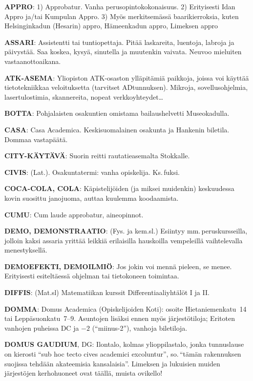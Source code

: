 \documentclass[../ala_hataile.tex]{subfiles}
\begin{document}
\textbf{APPRO}: 1) Approbatur. Vanha perusopintokokonaisuus.
2) Erityisesti Idan Appro
ja/tai Kumpulan Appro. 3) Myös merkitsemässä
baarikierroksia, kuten Helsinginkadun
(Hesarin) appro, Hämeenkadun appro,
Limeksen appro

\textbf{ASSARI}: Assistentti tai tuntiopettaja. Pitää
laskareita, luentoja, labroja ja päivystää.
Saa koskea, kysyä, sinutella ja muutenkin
vaivata. Neuvoo mieluiten vastaanottoaikana.

\textbf{ATK-ASEMA}: Yliopiston ATK-osaston ylläpitämiä paikkoja, joissa voi käyttää
tietotekniikkaa veloituksetta (tarvitset ADtunnuksen).
Mikroja, sovellusohjelmia,
lasertulostimia, skannereita, nopeat verkkoyhteydet\dots

\textbf{BOTTA}: Pohjalaisten osakuntien omistama
bailaushelvetti Museokadulla.

\textbf{CASA}: Casa Academica. Keskisuomalainen
osakunta ja Hankenin biletila. Dommaa
vastapäätä.

\textbf{CITY-KÄYTÄVÄ}: Suorin reitti rautatieasemalta
Stokkalle.

\textbf{CIVIS}: (Lat.). Osakuntatermi: vanha opiskelija.
Ks.\,fuksi.

\textbf{COCA-COLA, COLA}: Käpistelijöiden
(ja miksei muidenkin) keskuudessa kovin
suosittu janojuoma, auttaa kuulemma koodaamista.

\textbf{CUMU}: Cum laude approbatur, aineopinnot.

\textbf{DEMO, DEMONSTRAATIO}: (Fys. ja
kem.sl.) Esiintyy mm.\,peruskursseilla, jolloin
kaksi assaria yrittää leikkiä erilaisilla
hauskoilla vempeleillä vaihtelevalla menestyksellä.

\textbf{DEMOEFEKTI, DEMOILMIÖ}: Jos
jokin voi mennä pieleen, se menee. Erityisesti
esiteltäessä ohjelman tai tietokoneen
toimintaa.

\textbf{DIFFIS}: (Mat.sl) Matematiikan kurssit
Differentiaaliyhtälöt I ja II.

\textbf{DOMMA}: Domus Academica (Opiskelijoiden
Koti): osoite Hietaniemenkatu~14 tai
Leppäsuonkatu~7--9. Asuntojen lisäksi ennen
myös järjestötiloja; Eritoten vanhojen
puheissa DC ja $-2$ (``miinus-2''), vanhoja
biletiloja.

\textbf{DOMUS GAUDIUM}, DG: Ilontalo, kolmas
ylioppilastalo, jonka tunnuslause on
kierosti ``sub hoc tecto cives academici excoluntur'',
so.\,``tämän rakennuksen suojissa
tehdään akateemisia kansalaisia''. Limeksen
ja lukuisien muiden järjestöjen kerhohuoneet
ovat täällä, muista ovikello!
\end{document}
